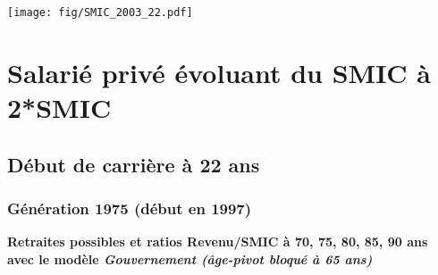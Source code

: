  \vspace{0.1cm} 

 \begin{center}\texttt{[image: fig/SMIC\_2003\_22.pdf]}\end{center} \label{fig/SMIC_2003_22.pdf} 

\newpage 
 
\chapter{Salarié privé évoluant du SMIC à 2*SMIC} 


 \addto{\captionsenglish}{ \renewcommand{\mtctitle}{}} \setcounter{minitocdepth}{2} 
 \minitoc \newpage 

\section{Début de carrière à 22 ans} 

\subsection{Génération 1975 (début en 1997)} 

{\bf \noindent Retraites possibles et ratios Revenu/SMIC à 70, 75, 80, 85, 90 ans avec le modèle \emph{Gouvernement (âge-pivot bloqué à 65 ans)}}  
 
